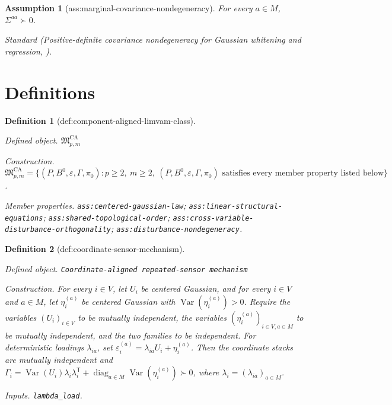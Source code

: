 \documentclass{article}
\newtheorem{assumption}{Assumption}
\newtheorem{definition}{Definition}
\begin{document}
\begin{assumption}[ass:marginal-covariance-nondegeneracy]\label{ass:marginal-covariance-nondegeneracy}
For every \(a\in M\), \(\Sigma^{aa}\succ0\).
\par\smallskip\noindent\emph{Standard} (Positive-definite covariance nondegeneracy for Gaussian whitening and regression, \cite{Vershynin2018HighDimensionalProbability}).
\end{assumption}

\section{Definitions}

\begin{definition}[def:component-aligned-limvam-class]\label{def:component-aligned-limvam-class}
\par\smallskip\noindent\emph{Defined object.} \(\mathfrak M_{p,m}^{\mathrm{CA}}\)
\par\smallskip\noindent\emph{Construction.} \(\mathfrak M_{p,m}^{\mathrm{CA}}=\{(P,B^0,\varepsilon,\Gamma,\pi_0):p\ge2,\ m\ge2,\ (P,B^0,\varepsilon,\Gamma,\pi_0)\text{ satisfies every member property listed below}\}\).
\par\smallskip\noindent\emph{Member properties.} \texttt{ass:\allowbreak{}centered-\allowbreak{}gaussian-\allowbreak{}law}; \texttt{ass:\allowbreak{}linear-\allowbreak{}structural-\allowbreak{}equations}; \texttt{ass:\allowbreak{}shared-\allowbreak{}topological-\allowbreak{}order}; \texttt{ass:\allowbreak{}cross-\allowbreak{}variable-\allowbreak{}disturbance-\allowbreak{}orthogonality}; \texttt{ass:\allowbreak{}disturbance-\allowbreak{}nondegeneracy}.
\end{definition}

\begin{definition}[def:coordinate-sensor-mechanism]\label{def:coordinate-sensor-mechanism}
\par\smallskip\noindent\emph{Defined object.} \texttt{Coordinate-\allowbreak{}aligned repeated-\allowbreak{}sensor mechanism}
\par\smallskip\noindent\emph{Construction.} For every \(i\in V\), let \(U_i\) be centered Gaussian, and for every \(i\in V\) and \(a\in M\), let \(\eta_i^{(a)}\) be centered Gaussian with \(\operatorname{Var}(\eta_i^{(a)})>0\). Require the variables \((U_i)_{i\in V}\) to be mutually independent, the variables \((\eta_i^{(a)})_{i\in V,a\in M}\) to be mutually independent, and the two families to be independent. For deterministic loadings \(\lambda_{ia}\), set \(\varepsilon_i^{(a)}=\lambda_{ia}U_i+\eta_i^{(a)}\). Then the coordinate stacks are mutually independent and \(\Gamma_i=\operatorname{Var}(U_i)\lambda_i\lambda_i^{\mathsf T}+\operatorname{diag}_{a\in M}\operatorname{Var}(\eta_i^{(a)})\succ0\), where \(\lambda_i=(\lambda_{ia})_{a\in M}\).
\par\smallskip\noindent\emph{Inputs.} \texttt{lambda\_\allowbreak{}load}.
\end{definition}
\end{document}
